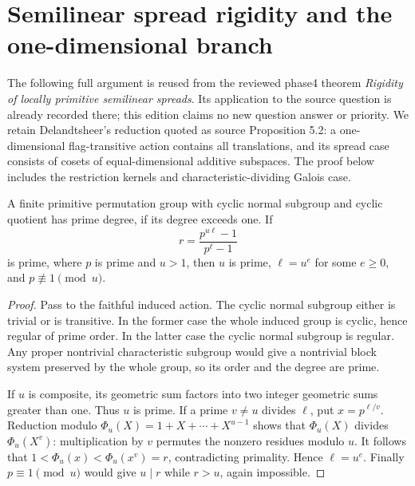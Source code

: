 \section{Semilinear spread rigidity and the one-dimensional branch}
The following full argument is reused from the reviewed phase4 theorem
\emph{Rigidity of locally primitive semilinear spreads}. Its application
to the source question is already recorded there; this edition claims
no new question answer or priority. We retain Delandtsheer's reduction
quoted as source Proposition 5.2: a one-dimensional flag-transitive action
contains all translations, and its spread case consists of cosets of
equal-dimensional additive subspaces. The proof below includes the
restriction kernels and characteristic-dividing Galois case.

\begin{lemma}\label{prime}
A finite primitive permutation group with cyclic normal subgroup and
cyclic quotient has prime degree, if its degree exceeds one. If
\[
 r=\frac{p^{u\ell}-1}{p^\ell-1}
\]
is prime, where $p$ is prime and $u>1$, then $u$ is prime,
$\ell=u^e$ for some $e\ge0$, and $p\not\equiv1\pmod u$.
\end{lemma}
\begin{proof}
Pass to the faithful induced action. The cyclic normal subgroup either
is trivial or is transitive. In the former case the whole induced group
is cyclic, hence regular of prime order. In the latter case the cyclic
normal subgroup is regular. Any proper nontrivial characteristic subgroup
would give a nontrivial block system preserved by the whole group, so
its order and the degree are prime.

If $u$ is composite, its geometric sum factors into two integer
geometric sums greater than one. Thus $u$ is prime. If a prime
$v\ne u$ divides $\ell$, put $x=p^{\ell/v}$. Reduction modulo
$\Phi_u(X)=1+X+\cdots+X^{u-1}$ shows that $\Phi_u(X)$ divides
$\Phi_u(X^v)$: multiplication by $v$ permutes the nonzero residues
modulo $u$. It follows that
$1<\Phi_u(x)<\Phi_u(x^v)=r$, contradicting primality. Hence
$\ell=u^e$. Finally $p\equiv1\pmod u$ would give $u\mid r$ while
$r>u$, again impossible.
\end{proof}

